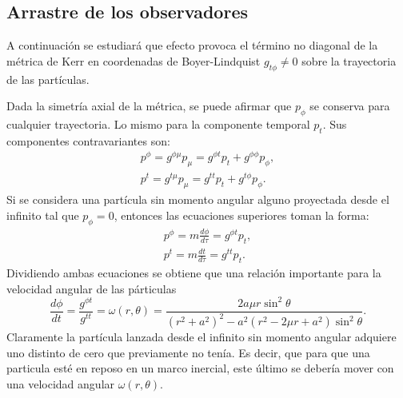 \documentclass[12pt]{article}
\theoremstyle{plain}
\begin{document}
\subsection{Arrastre de los observadores}
A continuación se estudiará que efecto provoca el término no diagonal de la métrica de Kerr en coordenadas de Boyer-Lindquist $g_{t\phi}\neq 0$ sobre la trayectoria de las partículas.

Dada la simetría axial de la métrica, se puede afirmar que $p_{\phi}$ se conserva para cualquier trayectoria. Lo mismo para la componente temporal $p_t$. Sus componentes contravariantes son:
\begin{equation}\nonumber
\begin{split}
p^{\phi} = g^{\phi\mu}p_{\mu}=g^{\phi t}p_t+g^{\phi\phi}p_{\phi},\\
p^t = g^{t\mu}p_{\mu}=g^{tt}p_t+g^{t\phi}p_{\phi}.
\end{split}
\end{equation}
Si se considera una partícula sin momento angular alguno proyectada desde el infinito tal que $p_{\phi}=0$, entonces las ecuaciones superiores toman la forma\cite{matintro}:
\begin{equation}\nonumber
\begin{split}
p^{\phi} = m\frac{d\phi}{d\tau}=g^{\phi t}p_t,\\
p^t = m\frac{dt}{d\tau}=g^{tt}p_t.
\end{split}
\end{equation}
Dividiendo ambas ecuaciones se obtiene que una relación importante para la velocidad angular de las párticulas 
\begin{equation}\nonumber
\frac{d\phi}{dt}=\frac{g^{\phi t}}{g^{tt}}=\omega (r,\theta)=\frac{2a\mu r\sin ^2\theta}{(r^2+a^2)^2-a^2(r^2 -2\mu r +a^2)\sin ^2\theta}.
\end{equation} 
Claramente la partícula lanzada desde el infinito sin momento angular adquiere uno distinto de cero que previamente no tenía. Es decir, que para que una particula esté en reposo en un marco inercial, este último se debería mover con una velocidad angular $\omega(r,\theta).$ 
\end{document}
